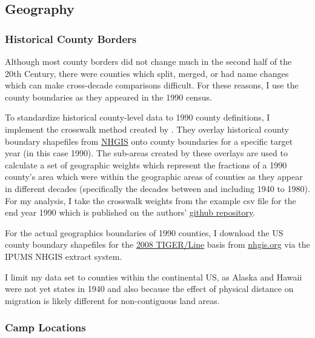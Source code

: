 \documentclass[12pt]{article}
\begin{document}
\subsection{Geography}\label{geography}

\subsubsection{Historical County Borders}\label{historical-county-borders}

Although most county borders did not change much in the second half of
the 20th Century, there were counties which split, merged, or had name
changes which can make cross-decade comparisons difficult. For these
reasons, I use the county boundaries as they appeared in the 1990 census.


To standardize historical county-level data to 1990 county definitions, I implement the crosswalk
method created by \cite{eckert_method_2020}. They overlay historical
county boundary shapefiles from \href{https://www.nhgis.org/}{NHGIS}
onto county boundaries for a specific target year (in this case 1990).
The sub-areas created by these overlays are used to calculate a set of
geographic weights which represent the fractions of a 1990 county's area
which were within the geographic areas of counties as they appear in
different decades (specifically the decades between and including 1940
to 1980). For my analysis, I take the crosswalk weights from the example
csv file for the end year 1990 which is published on the authors'
\href{https://github.com/liang-jack-a/EGLP_Crosswalk/tree/master}{github
repository}.

For the actual geographics boundaries of 1990 counties, I download the US county boundary shapefiles for the \href{https://www.census.gov/geographies/mapping-files/time-series/geo/tiger-line-file.html}{2008 TIGER/Line} basis from \url{nhgis.org} via the IPUMS NHGIS extract system.

I limit my data set to counties within the continental US, as Alaska and Hawaii were not yet states in 1940 and also because the effect of physical distance on migration is likely different for non-contiguous land areas.


\subsubsection{Camp Locations}\label{camp-locations}
\end{document}
